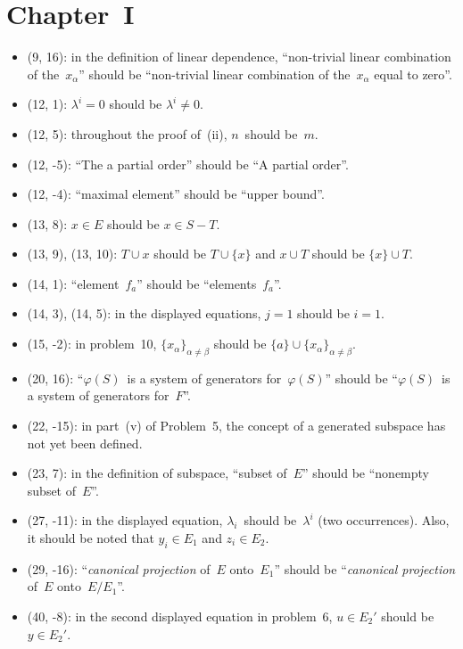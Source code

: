 \documentclass[letterpaper,12pt]{article}
\newcommand{\union}{\cup}
\begin{document}
\section*{Chapter~I}
\begin{itemize}
\item (9, 16): in the definition of linear dependence, ``non-trivial linear combination of the~\(x_{\alpha}\)'' should be ``non-trivial linear combination of the~\(x_{\alpha}\) equal to zero''.
\item (12, 1): \(\lambda^i=0\) should be \(\lambda^i\ne 0\).
\item (12, 5): throughout the proof of~(ii), \(n\)~should be~\(m\).
\item (12, -5): ``The a partial order'' should be ``A partial order''.
\item (12, -4): ``maximal element'' should be ``upper bound''.
\item (13, 8): \(x\in E\) should be \(x\in S-T\).
\item (13, 9), (13, 10): \(T\union x\) should be \(T\union\{x\}\) and \(x\union T\) should be \(\{x\}\union T\).
\item (14, 1): ``element~\(f_a\)'' should be ``elements~\(f_a\)''.
\item (14, 3), (14, 5): in the displayed equations, \(j=1\) should be \(i=1\).
\item (15, -2): in problem~10, \(\{x_{\alpha}\}_{\alpha\ne\beta}\) should be \(\{a\}\union\{x_{\alpha}\}_{\alpha\ne\beta}\).
\item (20, 16): ``\(\varphi(S)\)~is a system of generators for~\(\varphi(S)\)'' should be ``\(\varphi(S)\)~is a system of generators for~\(F\)''.
\item (22, -15): in part~(v) of Problem~5, the concept of a generated subspace has not yet been defined.
\item (23, 7): in the definition of subspace, ``subset of~\(E\)'' should be ``nonempty subset of~\(E\)''.
\item (27, -11): in the displayed equation, \(\lambda_i\)~should be~\(\lambda^i\) (two occurrences). Also, it should be noted that \(y_i\in E_1\) and \(z_i\in E_2\).
\item (29, -16): ``\emph{canonical projection} of~\(E\) onto~\(E_1\)'' should be ``\emph{canonical projection} of~\(E\) onto~\(E/E_1\)''.
\item (40, -8): in the second displayed equation in problem~6, \(u\in E_2'\) should be \(y\in E_2'\).
\end{itemize}
\end{document}
